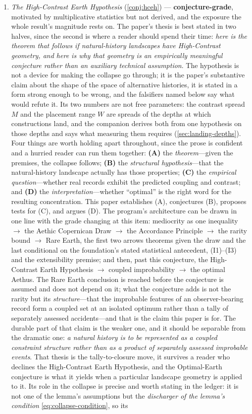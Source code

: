 \documentclass[11pt]{article}
\theoremstyle{definition}
\begin{document}
\begin{enumerate}
    \item \emph{The High-Contrast Earth Hypothesis} (\autoref{conj:hceh}) --- \textbf{conjecture-grade}, motivated by multiplicative statistics but not derived, and the exposure the whole result's magnitude rests on. The paper's thesis is best stated in two halves, since the second is where a reader should spend their time: \emph{here is the theorem that follows if natural-history landscapes have High-Contrast geometry, and here is why that geometry is an empirically meaningful conjecture rather than an auxiliary technical assumption}. The hypothesis is not a device for making the collapse go through; it is the paper's substantive claim about the shape of the space of alternative histories, it is stated in a form strong enough to be wrong, and the falsifiers named below say what would refute it. Its two numbers are not free parameters: the contrast spread $M$ and the placement range $W$ are spreads of the depths at which constructions land, and the companion derives both from one hypothesis on those depths and says what measuring them requires (\autoref{sec:landing-depths}). Four things are worth holding apart throughout, since the prose is confident and a hurried reader can run them together: \textbf{(A)} the \emph{theorem}---given the premises, the collapse follows; \textbf{(B)} the \emph{structural hypothesis}---that the natural-history landscape actually has those properties; \textbf{(C)} the \emph{empirical question}---whether real records exhibit the predicted coupling and contrast; and \textbf{(D)} the \emph{interpretation}---whether ``optimal'' is the right word for the resulting concentration. This paper establishes (A), conjectures (B), proposes tests for (C), and argues (D). The program's architecture can be drawn in one line with the grade changing at this item: mediocrity as one inequality $\to$ the Aethic Copernican Draw $\to$ the Accordance Principle $\to$ the rarity bound $\to$ Rare Earth, the first two arrows theorems given the draw and the last conditional on the foundation's stated statistical antecedent, (I1)--(I3) and the extensibility premise; and then, past this conjecture, the High-Contrast Earth Hypothesis $\to$ coupled improbability $\to$ the optimal Aethus. The Rare Earth conclusion is reached before the conjecture is assumed and does not depend on it; what the conjecture adds is not the rarity but its \emph{structure}---that the improbable features of an observer-bearing record form a coupled set at an isolated optimum rather than a tally of separately assessed accidents---and that is the claim this paper is for. The durable part of that claim is the weaker one, and it should be separable from the dramatic one: \emph{a natural history is to be represented as a coupled constraint structure rather than as a product of separately assessed improbable events}. That thesis is the tally-to-closure move, it survives a reader who declines the High-Contrast Earth Hypothesis, and the Optimal-Earth conjecture is what it yields when a particular landscape geometry is applied to it. Its role in the collapse is precise and worth stating in the ledger: it is not one of the lemma's assumptions but the \emph{discharger of the lemma's condition} \eqref{eq:collapse-condition}, so its 
\end{enumerate}
\end{document}
